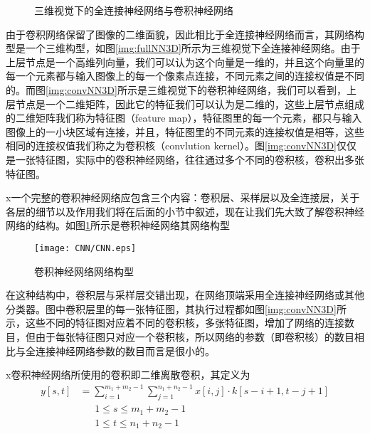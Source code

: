 \begin{figure}[htbp]
\centering
\subfigure{\label{img:fullNN3D}}\addtocounter{subfigure}{-2}
\subfigure{\label{img:convNN3D}}\addtocounter{subfigure}{-2}
\caption{三维视觉下的全连接神经网络与卷积神经网络}
\vspace{-1em}
\end{figure}

由于卷积网络保留了图像的二维面貌，因此相比于全连接神经网络而言，其网络构型是一个三维构型，如图\ref{img:fullNN3D}所示为三维视觉下全连接神经网络。由于上层节点是一个高维列向量，我们可以认为这个向量是一维的，并且这个向量里的每一个元素都与输入图像上的每一个像素点连接，不同元素之间的连接权值是不同的。而图\ref{img:convNN3D}所示是三维视觉下的卷积神经网络，我们可以看到，上层节点是一个二维矩阵，因此它的特征我们可以认为是二维的，这些上层节点组成的二维矩阵我们称为特征图（feature map），特征图里的每一个元素，都只与输入图像上的一小块区域有连接，并且，特征图里的不同元素的连接权值是相等，这些相同的连接权值我们称之为卷积核（convlution kernel）。图\ref{img:convNN3D}仅仅是一张特征图，实际中的卷积神经网络，往往通过多个不同的卷积核，卷积出多张特征图。

x一个完整的卷积神经网络应包含三个内容：卷积层、采样层以及全连接层，关于各层的细节以及作用我们将在后面的小节中叙述，现在让我们先大致了解卷积神经网络的结构。如图\ref{img:CNN}所示是卷积神经网络其网络构型
\begin{figure}[!htbp]
\centering
\texttt{[image: CNN/CNN.eps]}
\caption{卷积神经网络网络构型}
\label{img:CNN}
\end{figure}

在这种结构中，卷积层与采样层交错出现，在网络顶端采用全连接神经网络或其他分类器。图中卷积层里的每一张特征图，其执行过程都如图\ref{img:convNN3D}所示，这些不同的特征图对应着不同的卷积核，多张特征图，增加了网络的连接数目，但由于每张特征图只对应一个卷积核，所以网络的参数（即卷积核）的数目相比与全连接神经网络参数的数目而言是很小的。

x卷积神经网络所使用的卷积即二维离散卷积，其定义为
\begin{equation}
\begin{split}
y[s, t] &= \sum\limits_{i=1}^{m_1 +  m_2 -1}\sum \limits_{j=1}^{n_1 + n_2 -1} x[i, j]\cdot k[s-i+1, t-j+1]\\
&~~~~~~~ 1\leq s \leq m_1 + m_2 -1\\
&~~~~~~~ 1\leq t  \leq n_1  + n_2 - 1
\end{split}
\end{equation}

